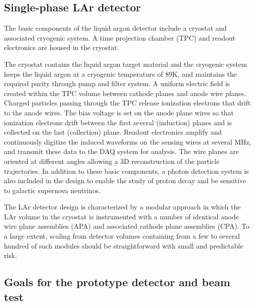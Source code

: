 \subsection{Single-phase LAr detector}

The basic components of the liquid argon detector include a cryostat and associated cryogenic system. A time projection chamber (TPC) and readout electronics are housed in the cryostat.

The cryostat contains the liquid argon target material and the cryogenic system keeps the liquid argon at a cryogenic temperature of 89K, and maintains the required purity through pump and filter system. A uniform electric field is created within the TPC volume between cathode planes and anode wire planes. Charged particles passing through the TPC release ionization electrons that drift to the anode wires. The bias voltage is set on the anode plane wires so that ionization electrons drift between the first several (induction) planes and is collected on the last (collection) plane. Readout electronics amplify and continuously digitize the induced waveforms on the sensing wires at several MHz, and transmit these data to the DAQ system for analysis. The wire planes are oriented at different angles allowing a 3D reconstruction of the particle trajectories. In addition to these basic components, a photon detection system is also included in the design to enable the study of proton decay and be sensitive to galactic supernova neutrinos.

The LAr detector design is characterized by a modular approach in which the LAr volume in the cryostat is instrumented with a number of identical anode wire plane assemblies (APA) and associated cathode plane assemblies (CPA). To a large extent, scaling from detector volumes containing from a few to several hundred of such modules should be straightforward with small and predictable risk.


\subsection{Goals for the prototype detector and beam test}



